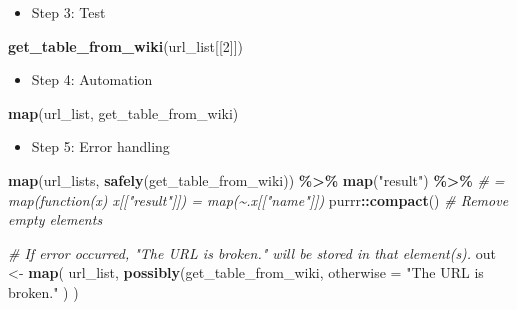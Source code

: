 \documentclass[
]{book}
\newenvironment{Shaded}{\begin{snugshade}}{\end{snugshade}}
\newcommand{\CommentTok}[1]{\textcolor[rgb]{0.56,0.35,0.01}{\textit{#1}}}
\newcommand{\DataTypeTok}[1]{\textcolor[rgb]{0.13,0.29,0.53}{#1}}
\newcommand{\DecValTok}[1]{\textcolor[rgb]{0.00,0.00,0.81}{#1}}
\newcommand{\KeywordTok}[1]{\textcolor[rgb]{0.13,0.29,0.53}{\textbf{#1}}}
\newcommand{\NormalTok}[1]{#1}
\newcommand{\OperatorTok}[1]{\textcolor[rgb]{0.81,0.36,0.00}{\textbf{#1}}}
\newcommand{\StringTok}[1]{\textcolor[rgb]{0.31,0.60,0.02}{#1}}
\providecommand{\tightlist}{%
  \setlength{\itemsep}{0pt}\setlength{\parskip}{0pt}}
\begin{document}
\begin{itemize}
\tightlist
\item
  Step 3: Test
\end{itemize}

\begin{Shaded}
\begin{Highlighting}[]
\KeywordTok{get\_table\_from\_wiki}\NormalTok{(url\_list[[}\DecValTok{2}\NormalTok{]])}
\end{Highlighting}
\end{Shaded}

\begin{itemize}
\tightlist
\item
  Step 4: Automation
\end{itemize}

\begin{Shaded}
\begin{Highlighting}[]
\KeywordTok{map}\NormalTok{(url\_list, get\_table\_from\_wiki)}
\end{Highlighting}
\end{Shaded}

\begin{itemize}
\tightlist
\item
  Step 5: Error handling
\end{itemize}

\begin{Shaded}
\begin{Highlighting}[]
\KeywordTok{map}\NormalTok{(url\_lists, }\KeywordTok{safely}\NormalTok{(get\_table\_from\_wiki)) }\OperatorTok{\%\textgreater{}\%}
\StringTok{  }\KeywordTok{map}\NormalTok{(}\StringTok{"result"}\NormalTok{) }\OperatorTok{\%\textgreater{}\%}\StringTok{ }
\StringTok{  }\CommentTok{\# = map(function(x) x[["result"]]) = map(\textasciitilde{}.x[["name"]])}
\StringTok{  }\NormalTok{purrr}\OperatorTok{::}\KeywordTok{compact}\NormalTok{() }\CommentTok{\# Remove empty elements}
\end{Highlighting}
\end{Shaded}

\begin{Shaded}
\begin{Highlighting}[]
\CommentTok{\# If error occurred, "The URL is broken." will be stored in that element(s).}
\NormalTok{out \textless{}{-}}\StringTok{ }\KeywordTok{map}\NormalTok{(}
\NormalTok{  url\_list,}
  \KeywordTok{possibly}\NormalTok{(get\_table\_from\_wiki,}
    \DataTypeTok{otherwise =} \StringTok{"The URL is broken."}
\NormalTok{  )}
\NormalTok{)}
\end{Highlighting}
\end{Shaded}
\end{document}
